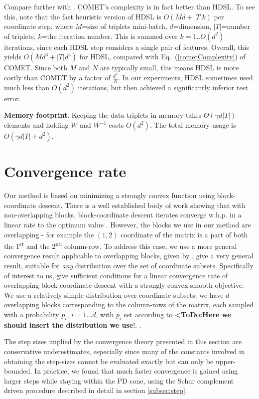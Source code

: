 \documentclass{article} %
\newcommand\todo[1]{\textbf{<ToDo:#1}!}
\newcommand\mat[1]{{#1}}
\newcommand{\W}{\mat{W}}
\renewcommand{\eqref}[1]{Eq.~(\ref{#1})}
\begin{document}
Compare further with \citet{hdsl}. COMET’s complexity is in fact better than HDSL. To see this, note that the fast heuristic version of HDSL is $O(Md+|T|k)$ per coordinate step, where $M$=size of triplets mini-batch, $d$=dimension, $|T|$=number of triplets, $k$=the iteration number. This is summed over $k=1..O(d^2)$ iterations, since each HDSL step considers a single pair of features. Overall, this yields $O(Md^3+|T|d^4)$ for HDSL, compared with \eqref{cometComplexity} of COMET. Since both $M$ and $N$ are typically small, this means HDSL is more costly than COMET by a factor of $\frac{d^2}{N}$. In our experiments, HDSL sometimes used much less than $O(d^2)$ iterations, but then achieved a significantly inferior test error.

{\bf Memory footprint}. Keeping the data triplets in memory takes $O(\gamma d |T|)$ elements and holding $\W$ and $\W^{-1}$ costs $O(d^2)$. The total memory usage is $O(\gamma d |T| + d^2)$. 

\section{Convergence rate}
Our method is based on minimizing a strongly convex function using block-coordinate descent. There is a well established body of work showing that with non-overlapping blocks, block-coordinate descent iterates converge w.h.p. in a linear rate to the optimum value \cite{nesterov2012efficiency,richtarik2014iteration}.
However, the blocks we use in our method are overlapping - for example the $(1,2)$ coordinate of the matrix is a part of both the 1\textsuperscript{st} and the 2\textsuperscript{nd} column-row. To address this case, we use a more general convergence result applicable to overlapping blocks, given by \citet{richtarik2013optimal}. \citeauthor{richtarik2013optimal} give a very general result, suitable for \emph{any} distribution over the set of coordinate subsets. 
Specifically of interest to us, \citeauthor{richtarik2013optimal} give sufficient conditions for a linear convergence rate of overlapping block-coordinate descent with a strongly convex smooth objective. 
We use a relatively simple distribution over coordinate subsets: we have $d$ overlapping blocks corresponding to the column-rows of the matrix, each sampled with a probability $p_i$, $i=1 \ldots d$, with $p_i$ set according to \todo{Here we should insert the distribution we use}.
.

The step sizes implied by the convergence theory presented in this section are conservative underestimates, especially since many of the constants involved in obtaining the step-sizes cannot be evaluated exactly but can only be upper-bounded. In practice, we found that much faster convergence is gained using larger steps while staying within the PD cone, using the Schur complement driven procedure described in detail in section \ref{subsec:step}.
\end{document}
